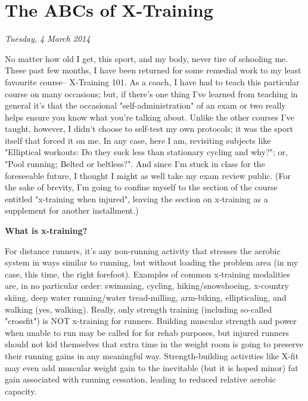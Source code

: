 \chapter{The ABCs of X-Training}
\textit{Tuesday, 4 March 2014}
\bigskip

No matter how old I get, this sport, and my body, never tire of schooling me. These past few months, I have been returned for some remedial work to my least favourite course-- X-Training 101. As a coach, I have had to teach this particular course on many occasions; but, if there's one thing I've learned from teaching in general it's that the occasional "self-administration" of an exam or two really helps ensure you know what you're talking about. Unlike the other courses I've taught, however, I didn't choose to self-test my own protocols; it was the sport itself that forced it on me. In any case, here I am, revisiting subjects like "Elliptical workouts: Do they suck less than stationary cycling and why?"; or, "Pool running; Belted or beltless?". And since I'm stuck in class for the foreseeable future, I thought I might as well take my exam review public. (For the sake of brevity, I'm going to confine myself to the section of the course entitled "x-training when injured", leaving the section on x-training as a supplement for another installment.)

\bigskip

\textbf{What is x-training?}

\bigskip

For distance runners, it's any non-running activity that stresses the aerobic system in ways similar to running, but without loading the problem area (in my case, this time, the right forefoot). Examples of common x-training modalities are, in no particular order: swimming, cycling, hiking/snowshoeing, x-country skiing, deep water running/water tread-milling, arm-biking, ellipticaling, and walking (yes, walking). Really, only strength training (including so-called "crossfit") is NOT x-training for runners. Building muscular strength and power when unable to run may be called for for rehab purposes, but injured runners should not kid themselves that extra time in the weight room is going to preserve their running gains in any meaningful way. Strength-building activities like X-fit may even add muscular weight gain to the inevitable (but it is hoped minor) fat gain associated with running cessation, leading to reduced relative aerobic capacity.

\bigskip

